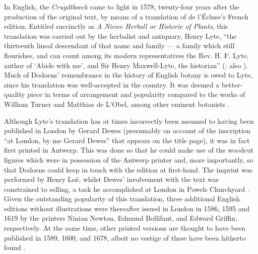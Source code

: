 \begin{paper}
In English, the \emph{Cruydtboeck} came to light in 1578, twenty-four
years after the production of the original text, by means of a
translation of de l'Écluse's French edition. Entitled succinctly as
\emph{A Niewe Herball or Historie of Plants}, this translation was
carried out by the herbalist and antiquary, Henry Lyte, ``the thirteenth
lineal descendant of that name and family –– a family which still
flourishes, and can count among its modern representatives the Rev. H.
F. Lyte, author of `Abide with me', and Sir Henry Maxwell-Lyte, the
historian'' (\cite[125]{arber_herbals_1953}; also \cite{boulger_lyte_2004}). Much of
Dodoens' remembrance in the history of English botany is owed to Lyte,
since his translation was well-accepted in the country. It was deemed a
better-quality piece in terms of arrangement and popularity compared to the works
of William Turner and Matthias de L'Obel, among other eminent botanists
\citep[138]{barlow_old_1913}.

Although Lyte's translation has at times incorrectly been assumed to having been published in London
by Gerard Dewes (presumably on account of the inscription ``at London, by
me Gerard Dewes'' that appears on the title page), it was in fact
first printed in Antwerp. This was done so that he could make use of the woodcut
figures which were in possession of the Antwerp printer and, more
importantly, so that Dodoens could keep in touch with the edition at
first-hand. The imprint was
performed by Henry Loë, whilst Dewes' involvement with the text was
constrained to selling, a task he accomplished at London in Powels
Churchyard \citep[139--140]{barlow_old_1913}. Given the outstanding popularity of this translation, three additional
English editions without illustrations were thereafter issued in London
in 1586, 1595 and 1619 by the printers Ninian Newton, Edmund Bollifant,
and Edward Griffin, respectively. At the same time, other printed
versions are thought to have been published in 1589, 1600, and 1678,
albeit no vestige of these have been hitherto found \citep[141]{barlow_old_1913}.


\end{paper}
